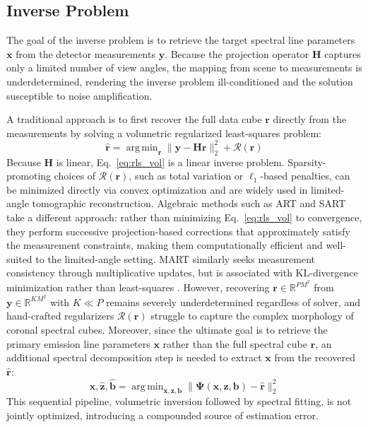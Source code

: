 \documentclass[linenumbers,twocolumn]{aastex7}
\DeclareMathOperator*{\argmin}{arg\,min}
\begin{document}
\subsection{Inverse Problem}

The goal of the inverse problem is to retrieve the target spectral line
parameters $\bm x$ from the detector measurements $\bm y$. Because the
projection operator $\bm H$ captures only a limited number of view angles, the
mapping from scene to measurements is underdetermined, rendering the inverse
problem ill-conditioned and the solution susceptible to noise amplification.

A traditional approach is to first recover the full data cube $\bm r$ directly
from the measurements by solving a volumetric regularized least-squares problem:
\begin{equation}
\hat{\bm r} = \argmin_{\bm r} \|\bm y - \bm H \bm r\|_2^2 + \mathcal R(\bm r)
\label{eq:rls_vol}
\end{equation}
Because $\bm H$ is linear, Eq.~\eqref{eq:rls_vol} is a linear inverse problem.
Sparsity-promoting choices of $\mathcal R(\bm r)$, such as total variation or
$\ell_1$-based penalties, can be minimized directly via convex optimization
\citep{sidky2008image, rudin1992nonlinear} and are widely used in limited-angle
tomographic reconstruction. Algebraic methods such as ART and SART
\citep{gordon1970algebraic, andersen1984simultaneous} take a different approach:
rather than minimizing Eq.~\eqref{eq:rls_vol} to convergence, they perform
successive projection-based corrections that approximately satisfy the
measurement constraints, making them computationally efficient and well-suited
to the limited-angle setting. MART \citep{gordon1970algebraic} similarly seeks
measurement consistency through multiplicative updates, but is associated with
KL-divergence minimization rather than least-squares \citep{byrne1993iterative}.
However, recovering $\bm r \in \mathbb R^{PM^2}$ from $\bm y \in \mathbb
R^{KM^2}$ with $K \ll P$ remains severely underdetermined regardless of solver,
and hand-crafted regularizers $\mathcal R(\bm r)$ struggle to capture the
complex morphology of coronal spectral cubes. Moreover, since the ultimate goal
is to retrieve the primary emission line parameters $\bm x$ rather than the full
spectral cube $\bm r$, an additional spectral decomposition step is needed to
extract $\bm x$ from the recovered $\hat{\bm r}$:
\begin{equation}
\hat{\bm x}, \hat{\bm z}, \hat{\bm b} = \argmin_{\bm x, \bm z, \bm b}
\|\bm \Psi(\bm x, \bm z, \bm b) - \hat{\bm r}\|_2^2
\label{eq:spec_fit}
\end{equation}
This sequential pipeline, volumetric inversion followed by spectral fitting,
is not jointly optimized, introducing a compounded source of estimation error.
\end{document}
